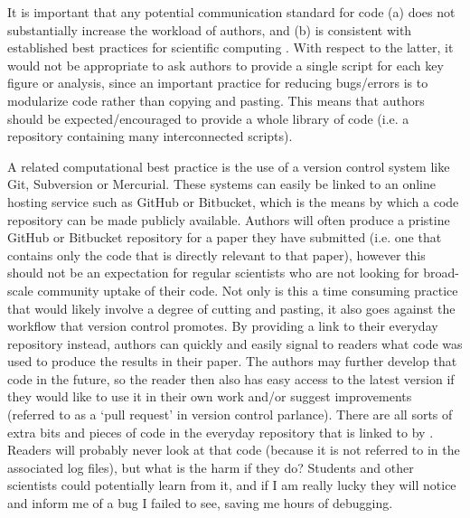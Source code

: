 It is important that any potential communication standard for code (a) does not substantially increase the workload of authors, and (b) is consistent with established best practices for scientific computing \citep{Wilson2014a}. With respect to the latter, it would not be appropriate to ask authors to provide a single script for each key figure or analysis, since an important practice for reducing bugs/errors is to modularize code rather than copying and pasting. This means that authors should be expected/encouraged to provide a whole library of code (i.e. a repository containing many interconnected scripts).

A related computational best practice is the use of a version control system like Git, Subversion or Mercurial. These systems can easily be linked to an online hosting service such as GitHub or Bitbucket, which is the means by which a code repository can be made publicly available. Authors will often produce a pristine GitHub or Bitbucket repository for a paper they have submitted (i.e. one that contains only the code that is directly relevant to that paper), however this should not be an expectation for regular scientists who are not looking for broad-scale community uptake of their code. Not only is this a time consuming practice that would likely involve a degree of cutting and pasting, it also goes against the workflow that version control promotes. By providing a link to their everyday repository instead, authors can quickly and easily signal to readers what code was used to produce the results in their paper. The authors may further develop that code in the future, so the reader then also has easy access to the latest version if they would like to use it in their own work and/or suggest improvements (referred to as a `pull request' in version control parlance). There are all sorts of extra bits and pieces of code in the everyday repository that is linked to by \citet{Irving2015}. Readers will probably never look at that code (because it is not referred to in the associated log files), but what is the harm if they do? Students and other scientists could potentially learn from it, and if I am really lucky they will notice and inform me of a bug I failed to see, saving me hours of debugging.       

